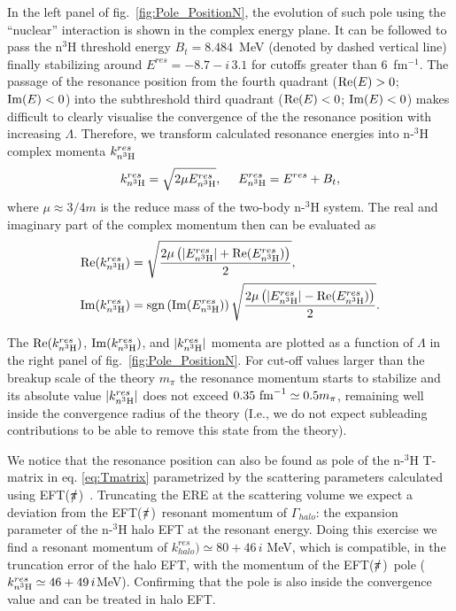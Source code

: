 \documentclass[5p,times]{elsarticle}
\newcommand{\eftnopi}{\mbox{EFT($\slashed{\pi}$) }}
\begin{document}
In the left panel of fig.~\ref{fig:Pole_PositionN}, the evolution of such pole using the ``nuclear'' interaction is shown in the complex energy plane. It can be followed to pass the n$^3$H threshold energy $B_{t}=8.484$~MeV (denoted by dashed vertical line) finally stabilizing around $E^{res}=-8.7-i\,3.1$ for cutoffs greater than $6$~fm$^{-1}$. The passage of the resonance position from the fourth quadrant (${\rm Re}(E)>0$; ${\rm Im}(E)<0$) into the subthreshold third quadrant (${\rm Re}(E)<0$; ${\rm Im}(E)<0$) makes difficult to clearly visualise the convergence of the the resonance position with increasing $\Lambda$. 
Therefore, we transform calculated resonance energies into n-$^3$H complex momenta $k^{res}_{n ^3{\rm H}}$  
\begin{equation}
    k^{res}_{n ^3{\rm H}} = \sqrt{2 \mu E^{res}_{n ^3{\rm H}}},~~~~E^{res}_{n ^3{\rm H}}= E^{res} + B_{t},
    \label{mmnt}
\end{equation}
where $\mu \approx 3/4 m$ is the reduce mass of the two-body n-$^3$H system. The real and imaginary part of the complex momentum then can be evaluated as  
\begin{equation}
    \begin{split}
        {\rm Re}(k^{res}_{n ^3{\rm H}}) &= \sqrt{\frac{2\mu \left(|E^{res}_{n ^3{\rm H}}|+{\rm Re}(E^{res}_{n ^3{\rm H}})\right)}{2}},\\
        {\rm Im}(k^{res}_{n ^3{\rm H}}) &=  {\rm sgn}\left({\rm Im}(E^{res}_{n ^3{\rm H}})\right)\sqrt{\frac{2\mu \left(|E^{res}_{n ^3{\rm H}}|-{\rm Re}(E^{res}_{n ^3{\rm H}})\right)}{2}}.\\
    \end{split}
    \label{kreim}
\end{equation}

The ${\rm Re}(k^{res}_{n ^3{\rm H}})$, ${\rm Im}(k^{res}_{n ^3{\rm H}})$, and $|k^{res}_{n ^3{\rm H}}|$ momenta are plotted as a function of $\Lambda$ in the right panel of fig.~\ref{fig:Pole_PositionN}.  
For cut-off values larger than the breakup scale of the theory $m_\pi$ the resonance momentum starts to stabilize and its absolute value $|k^{res}_{n ^3{\rm H}}|$ does not exceed $0.35~{\rm fm}^{-1}\simeq 0.5 m_\pi$, remaining well inside the convergence radius of the theory (I.e., we do not expect subleading contributions to be able to remove this state from the theory).
%

%
We notice that the resonance position can also be found as pole of the n-$^3$H T-matrix in eq. \ref{eq:Tmatrix} parametrized by the scattering parameters calculated using \eftnopi. 
Truncating the ERE at the scattering volume we expect a deviation from the \eftnopi resonant momentum of $\Gamma_{halo}$: the expansion parameter of the n-$^3$H halo EFT at the resonant energy.
Doing this exercise we find a resonant momentum of $k^{res}_{halo})\simeq80+46\,i$ MeV, which is compatible, in the truncation error of the halo EFT, with the momentum of the \eftnopi pole ($k^{res}_{n ^3{\rm H}}\simeq46+49\,i$MeV).
Confirming that the pole is also inside the convergence value and can be treated in halo EFT.  
%
\end{document}
